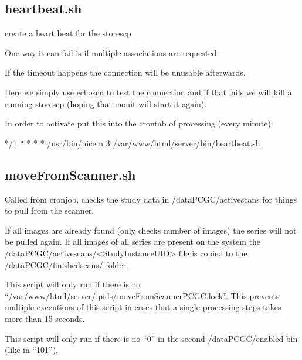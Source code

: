 \documentclass[letterpaper,10pt,english]{sphinxmanual}
\begin{document}
\sphinxstepscope


\subsection{heartbeat.sh}
\label{\detokenize{Architecture/scripts/heartbeat:heartbeat-sh}}\label{\detokenize{Architecture/scripts/heartbeat::doc}}
\sphinxAtStartPar
create a heart beat for the storescp

\sphinxAtStartPar
One way it can fail is if multiple associations are requested.

\sphinxAtStartPar
If the timeout happens the connection will be unusable afterwards.

\sphinxAtStartPar
Here we simply use echoscu to test the connection and if that fails we will kill a running storescp (hoping that monit will start it again).

\sphinxAtStartPar
In order to activate put this into the crontab of processing (every minute):

\begin{sphinxVerbatim}[commandchars=\\\{\}]
*/1 * * * * /usr/bin/nice \PYGZhy{}n 3 /var/www/html/server/bin/heartbeat.sh
\end{sphinxVerbatim}

\sphinxstepscope


\subsection{moveFromScanner.sh}
\label{\detokenize{Architecture/scripts/moveFromScanner:movefromscanner-sh}}\label{\detokenize{Architecture/scripts/moveFromScanner::doc}}
\sphinxAtStartPar
Called from cron\sphinxhyphen{}job, checks the study data in /dataPCGC/active\sphinxhyphen{}scans for things to pull from the scanner.

\sphinxAtStartPar
If all images are already found (only checks number of images) the series will not be pulled again.
If all images of all series are present on the system the /dataPCGC/active\sphinxhyphen{}scans/\textless{}StudyInstanceUID\textgreater{} file is copied to the /dataPCGC/finished\sphinxhyphen{}scans/ folder.

\sphinxAtStartPar
This script will only run if there is no “/var/www/html/server/.pids/moveFromScannerPCGC.lock”. This prevents multiple executions of this script in cases that a single processing steps takes more than 15 seconds.

\sphinxAtStartPar
This script will only run if there is no “0” in the second /dataPCGC/enabled bin (like in “101”).
\end{document}
